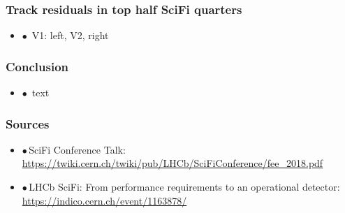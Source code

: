 \documentclass[aspectratio=1610, 12pt]{beamer}
\begin{document}
\begin{frame}\frametitle{Track residuals in top half SciFi quarters}
  \begin{itemize}
    \item $\bullet$\, V1: left, V2, right
  \end{itemize}
  \begin{figure}
  \end{figure}
\end{frame}

\begin{frame}\frametitle{Conclusion}
  \begin{itemize}
    \item $\bullet$\, text
  \end{itemize}
\end{frame}

\begin{frame}\frametitle{Sources}
  \begin{itemize}
    \item $\bullet$\,SciFi Conference Talk: \url{https://twiki.cern.ch/twiki/pub/LHCb/SciFiConference/fee_2018.pdf}
    \item $\bullet$\,LHCb SciFi: From performance requirements to an operational detector: \url{https://indico.cern.ch/event/1163878/}
  \end{itemize}
\end{frame}
\end{document}
